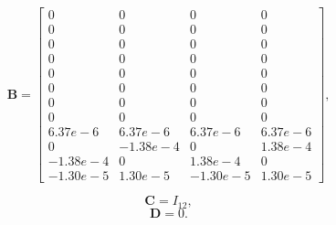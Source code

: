 \vspace{+0.3cm}

\[
\mathbf{B} = 
\left[
\begin{array}{cccccccccccc}
0 & 0 & 0 & 0\\
0 & 0 & 0 & 0\\
0 & 0 & 0 & 0\\
0 & 0 & 0 & 0\\
0 & 0 & 0 & 0\\
0 & 0 & 0 & 0\\
0 & 0 & 0 & 0\\
0 & 0 & 0 & 0\\
6.37e-6 & 6.37e-6 & 6.37e-6 & 6.37e-6\\
0 & -1.38e-4 & 0 & 1.38e-4\\
-1.38e-4 & 0 & 1.38e-4 & 0\\
-1.30e-5 & 1.30e-5 & -1.30e-5 & 1.30e-5
\end{array}\right],
\]

\vspace{+0.3cm}

\[
\mathbf{C} = I_{12},
\]
\vspace{-0.5cm}
\[
\mathbf{D} = 0.
\]